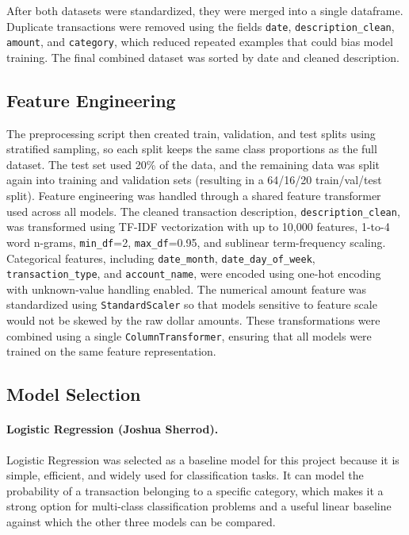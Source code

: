\documentclass[11pt]{article}
\begin{document}
After both datasets were standardized, they were merged into a single
dataframe. Duplicate transactions were removed using the fields
\texttt{date}, \texttt{description\_clean}, \texttt{amount}, and
\texttt{category}, which reduced repeated examples that could bias model
training. The final combined dataset was sorted by date and cleaned
description.

\subsection{Feature Engineering}

The preprocessing script then created train, validation, and test splits
using stratified sampling, so each split keeps the same class
proportions as the full dataset. The test set used 20\% of the data, and the remaining data was
split again into training and validation sets (resulting in a 64/16/20
train/val/test split). Feature engineering was handled through a shared
feature transformer used across all models. The cleaned transaction
description, \texttt{description\_clean}, was transformed using TF-IDF
vectorization with up to 10{,}000 features, 1-to-4 word n-grams,
\texttt{min\_df}=2, \texttt{max\_df}=0.95, and sublinear term-frequency
scaling. Categorical features, including \texttt{date\_month},
\texttt{date\_day\_of\_week}, \texttt{transaction\_type}, and
\texttt{account\_name}, were encoded using one-hot encoding with
unknown-value handling enabled. The numerical amount feature was
standardized using \texttt{StandardScaler} so that models sensitive to
feature scale would not be skewed by the raw dollar amounts. These
transformations were combined using a single \texttt{ColumnTransformer},
ensuring that all models were trained on the same feature representation.

\subsection{Model Selection}

\paragraph{Logistic Regression (Joshua Sherrod).}
Logistic Regression was selected as a baseline model for this project because
it is simple, efficient, and widely used for classification tasks. It can
model the probability of a transaction belonging to a specific category,
which makes it a strong option for multi-class classification problems and a
useful linear baseline against which the other three models can be compared.
\end{document}
